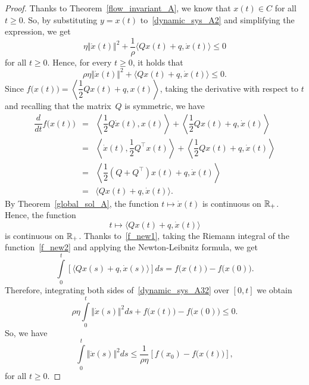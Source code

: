 \documentclass[11pt]{article}
\theoremstyle{definition}
\theoremstyle{remark}
\def\R{\Bbb R}
\begin{document}
\begin{proof}
Thanks to Theorem~\ref{flow_invariant_A}, we know that $x(t)\in C$ for all $t\geq 0$. So, by substituting $y=x(t)$ to~\eqref{dynamic_sys_A2} and simplifying the expression, we get
	\begin{equation*}
		\eta \Vert\dot{x}(t)\Vert^2 + \dfrac{1}{\rho}\big\langle Q x(t)+ q, \dot{x}(t)  \big\rangle \leq 0 
	\end{equation*}
for all $t\geq 0$. Hence, for every $t\geq 0$, it holds that
	\begin{equation}\label{dynamic_sys_A32}
	\rho\eta\Vert\dot{x}(t)\Vert^2 + \big\langle Q x(t)+ q, \dot{x}(t)  \big\rangle \leq 0.
\end{equation}
 Since $f \big(x(t)\big)=  \left\langle \dfrac{1}{2}Qx(t)+q,x(t) \right\rangle$, taking the derivative with respect to $t$ and recalling that the matrix~$Q$ is symmetric, we have
\begin{equation}\label{f_new1}\begin{array}{rcl}
\dfrac{d}{dt}f \big(x(t)\big) &=& \left\langle \dfrac{1}{2}Q\dot{x}(t),x(t)\right\rangle + \left\langle \dfrac{1}{2}Qx(t)+q,\dot{x}(t) \right\rangle\\
&=&\left\langle \dot{x}(t),\dfrac{1}{2} Q^\top x(t)\right\rangle + \left\langle \dfrac{1}{2}Qx(t)+q,\dot{x}(t) \right\rangle\\
&=& \left\langle \dfrac{1}{2}(Q+Q^\top) x(t)+q,\dot{x}(t) \right\rangle\\
&=&\big\langle Qx(t)+q,\dot{x}(t) \big\rangle.\end{array}
\end{equation} By Theorem~\ref{global_sol_A}, the function $t\mapsto\dot{x}(t)$ is continuous on $\R_+$. Hence, the function \begin{equation}\label{f_new2}t\mapsto\big\langle Qx(t)+q,\dot{x}(t) \big\rangle\end{equation} is continuous on $\R_+$. Thanks to~\eqref{f_new1}, taking the Riemann integral of the function~\eqref{f_new2} and applying the Newton-Leibnitz formula, we get
$$\int\limits_{0}^{t}[\big\langle Qx(s)+q,\dot{x}(s) \big\rangle]ds= f\big(x(t)\big)-f\big(x(0)\big).$$
Therefore, integrating both sides of~\eqref{dynamic_sys_A32} over $[0, t]$ we obtain
$$\rho\eta \int\limits_{0}^{t}\Vert\dot{x}(s)\Vert^2ds + f\big(x(t)\big)-f\big(x(0)\big)\leq 0.$$
So, we have
	\begin{equation}\label{dynamic_sys_A52}
 \int\limits_{0}^{t}\Vert\dot{x}(s)\Vert^2 ds\leq \dfrac{1}{\rho\eta}\left[f(x_0)- 	f\big(x(t)\big)\right],
	\end{equation}
	for all $t\geq 0$. 
	

\end{proof}
\end{document}
